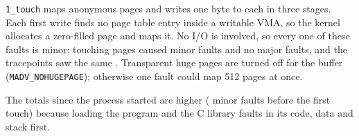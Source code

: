 \texttt{1\_touch} maps \TouchPages{} anonymous pages and writes one byte to
each in three stages. Each first write finds no page table entry inside a
writable VMA, so the kernel allocates a zero-filled page and maps it. No I/O
is involved, so every one of these faults is minor: touching
\TouchPages{} pages caused \TouchMinor{} minor faults and no major faults, and
the tracepoints saw the same \TouchSeen{}. Transparent huge pages are turned
off for the buffer (\texttt{MADV\_NOHUGEPAGE}); otherwise one fault could map
512 pages at once.

The totals since the process started are higher (\TouchStartupMinor{} minor
faults before the first touch) because loading the program and the C library
faults in its code, data and stack first.
